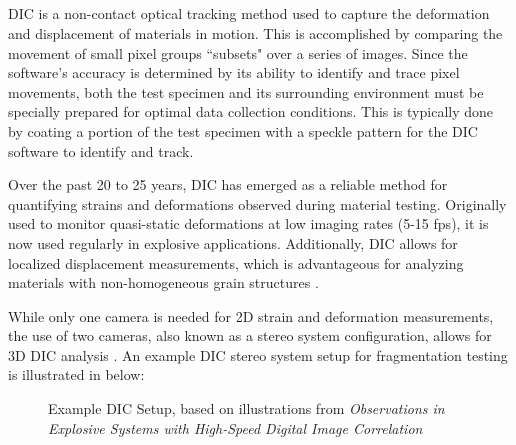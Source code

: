 \subsection{} \label{sec:2_Diagnostic_DIC}
\gls{DIC} is a non-contact optical tracking method used to capture the deformation and displacement of materials in motion. This is accomplished by comparing the movement of small pixel groups ``subsets" over a series of images. Since the software's accuracy is determined by its ability to identify and trace pixel movements, both the test specimen and its surrounding environment must be specially prepared for optimal data collection conditions. This is typically done by coating a portion of the test specimen with a speckle pattern for the \gls{DIC} software to identify and track.

Over the past 20 to 25 years, \gls{DIC} has emerged as a reliable method for quantifying strains and deformations observed during material testing. Originally used to monitor quasi-static deformations at low imaging rates (5-15 \gls{fps}), it is now used regularly in explosive applications. Additionally, \gls{DIC} allows for localized displacement measurements, which is advantageous for analyzing materials with non-homogeneous grain structures \cite{ReuDICapplication}.  %

While only one camera is needed for 2D strain and deformation measurements, the use of two cameras, also known as a stereo system configuration, allows for 3D \gls{DIC} analysis \cite{ArtandApplicationDICReu}. An example \gls{DIC} stereo system setup for fragmentation testing is illustrated in  below:  
%
\begin{figure}[H]
	\centering
    \caption{Example \gls{DIC} Setup, based on illustrations from \textit{Observations in Explosive Systems with High-Speed Digital Image Correlation} \cite{DICimageObservations}}
	\label{fig:2_DIC_setup}
\end{figure}
%

